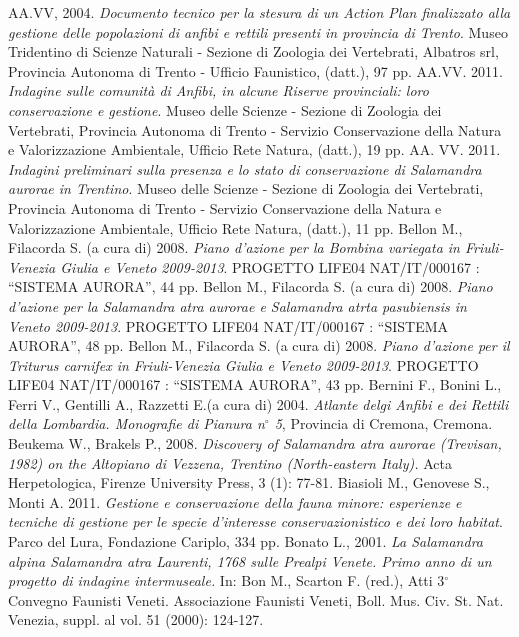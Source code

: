 \documentclass[10pt,twoside,openany,x11names,svgnames,italian,a5paper,dvipsnames,table]{memoir}
\begin{document}
\begin{thebibliography}{9}
{} AA.VV, 2004. \emph{Documento tecnico per la stesura di un Action Plan finalizzato alla gestione delle popolazioni di anfibi e rettili presenti in provincia di Trento}. Museo Tridentino di Scienze Naturali - Sezione di Zoologia dei Vertebrati, Albatros srl, Provincia Autonoma di Trento - Ufficio Faunistico, (datt.), 97 pp.
 AA.VV. 2011. \emph{Indagine sulle comunità di Anfibi, in alcune Riserve provinciali: loro conservazione e gestione}. Museo delle Scienze - Sezione di Zoologia dei Vertebrati, Provincia Autonoma di Trento - Servizio Conservazione della Natura e Valorizzazione Ambientale, Ufficio Rete Natura, (datt.), 19 pp.
AA. VV. 2011. \emph{Indagini preliminari sulla presenza e lo stato di conservazione di Salamandra aurorae in Trentino}. Museo delle Scienze - Sezione di Zoologia dei Vertebrati, Provincia Autonoma di Trento - Servizio Conservazione della Natura e Valorizzazione Ambientale, Ufficio Rete Natura, (datt.), 11 pp.
 Bellon M., Filacorda S. (a cura di) 2008. \emph{Piano d'azione per la \emph{Bombina variegata} in Friuli-Venezia Giulia e Veneto 2009-2013}. PROGETTO LIFE04 NAT/IT/000167 : “SISTEMA AURORA”, 44 pp.
Bellon M., Filacorda S. (a cura di) 2008. \emph{Piano d'azione per la \emph{Salamandra atra aurorae} e \emph{Salamandra atrta pasubiensis} in Veneto 2009-2013}. PROGETTO LIFE04 NAT/IT/000167 : “SISTEMA AURORA”, 48 pp.
Bellon M., Filacorda S. (a cura di) 2008. \emph{Piano d'azione per il \emph{Triturus carnifex} in Friuli-Venezia Giulia e Veneto 2009-2013}. PROGETTO LIFE04 NAT/IT/000167 : “SISTEMA AURORA”, 43 pp.
Bernini F., Bonini L., Ferri V., Gentilli A., Razzetti E.(a cura di) 2004. \emph{Atlante delgi Anfibi e dei Rettili della Lombardia. Monografie di Pianura n$^\circ$ 5}, Provincia di Cremona, Cremona.
 Beukema W., Brakels P., 2008. \emph{Discovery of \emph{Salamandra atra aurorae} (Trevisan, 1982) on the Altopiano di Vezzena, Trentino (North-eastern Italy).} Acta Herpetologica, Firenze University Press, 3 (1): 77-81.
Biasioli M., Genovese S., Monti A. 2011. \emph{Gestione e conservazione della fauna minore: esperienze e tecniche di gestione per le specie d'interesse conservazionistico e dei loro habitat}. Parco del Lura, Fondazione Cariplo, 334 pp.
 Bonato L., 2001. \emph{La Salamandra alpina \emph{Salamandra atra} Laurenti, 1768 sulle Prealpi Venete. Primo anno di un progetto di indagine intermuseale.} In: Bon M., Scarton F. (red.), Atti 3$^\circ$ Convegno Faunisti Veneti. Associazione Faunisti Veneti, Boll. Mus. Civ. St. Nat. Venezia, suppl. al vol. 51 (2000): 124-127.

\end{thebibliography}
\end{document}
